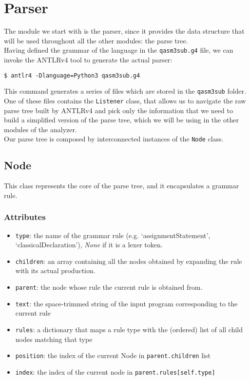 \documentclass[12pt,a4paper]{report}
\theoremstyle{definition}
\theoremstyle{definition}
\theoremstyle{definition}
\begin{document}
\section{Parser}
The module we start with is the parser, since it provides the data structure that will be used throughout all the other modules: the parse tree.\\
Having defined the grammar of the language in the \texttt{qasm3sub.g4} file, we can invoke the ANTLRv4 tool to generate the actual parser:
\begin{lstlisting}
$ antlr4 -Dlanguage=Python3 qasm3sub.g4
\end{lstlisting}
This command generates a series of files which are stored in the \texttt{qasm3sub} folder. One of these files contains the \texttt{Listener} class, that allows us to navigate the raw parse tree built by ANTLRv4 and pick only the information that we need to build a simplified version of the parse tree, which we will be using in the other modules of the analyzer.\\
Our parse tree is composed by interconnected instances of the \texttt{Node} class.

\subsection{Node}
This class represents the core of the parse tree, and it encapsulates a grammar rule.
\subsubsection{Attributes}
\begin{itemize}
    \itemsep 0em
    \item \texttt{type}: the name of the grammar rule (e.g. `assignmentStatement', `classicalDeclaration'), \textit{None} if it is a lexer token.
    \item \texttt{children}: an array containing all the nodes obtained by expanding the rule with its actual production.
    \item \texttt{parent}: the node whose rule the current rule is obtained from.
    \item \texttt{text}: the space-trimmed string of the input program corresponding to the current rule
    \item \texttt{rules}: a dictionary that maps a rule type with the (ordered) list of all child nodes matching that type
    \item \texttt{position}: the index of the current Node in \texttt{parent.children} list
    \item \texttt{index}: the index of the current node in \texttt{parent.rules[self.type]}
\end{itemize}
\end{document}

